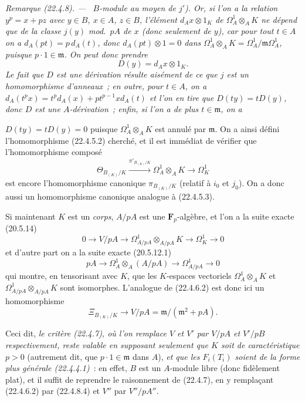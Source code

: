 \documentclass[10pt,oneside]{book}
\makeatletter
\newcommand{\setmanualcurrentlabel}[1]{\def\@currentlabel{#1}}
\newcommand{\oldpage}[2][]{%
  \setcounter{footnote}{0}%
  \marginpar{\scriptsize\textbf{#1}~|~#2}\ignorespaces}
\newenvironment{remark}[1][]{%
  \setmanualcurrentlabel{#1}\par\medskip\noindent\itshape Remarque (#1). ---\ }{\par}
\makeatother
\begin{document}
\begin{remark}[22.4.8]
$B$-module au moyen de $j'$). Or, si l'on a la relation $y^p=x+pz$ avec
$y\in B$, $x\in A$, $z\in B$, l'élément $d_Ax\otimes1_K$ de
$\Omega^1_A\otimes_AK$ ne dépend que de la classe $j(y)$ mod.~$pA$ de $x$
(donc seulement de $y$), car pour tout $t\in A$ on a
$d_A(pt)=p\,d_A(t)$, donc $d_A(pt)\otimes1=0$ dans
$\Omega^1_A\otimes_AK=\Omega^1_A/\mathfrak m\Omega^1_A$, puisque
$p\cdot1\in\mathfrak m$. On peut donc prendre
\[
  D(y)=d_Ax\otimes1_K.
\]
Le fait que $D$ est une dérivation résulte aisément de ce que $j$ est un
homomorphisme d'anneaux~; en outre, pour $t\in A$, on a
$d_A(t^px)=t^p d_A(x)+pt^{p-1}x d_A(t)$ et l'on en tire que
$D(ty)=tD(y)$, donc $D$ est une $A$-dérivation~; enfin, si l'on a de plus
$t\in\mathfrak m$, on a

\oldpage[0\textsubscript{IV-1}]{201}

$D(ty)=tD(y)=0$ puisque $\Omega^1_A\otimes_AK$ est annulé par $\mathfrak m$.
On a ainsi défini l'homomorphisme (22.4.5.2) cherché, et il est immédiat de
vérifier que l'homomorphisme composé
\[
  \Theta_{B_{(K)}/K}\xrightarrow{\pi'_{B_{(K)}/K}}
  \Omega^1_A\otimes_AK\longrightarrow\Omega^1_K
\]
est encore l'homomorphisme canonique $\pi_{B_{(K)}/K}$ (relatif à $i_0$ et
$j_0$). On a donc aussi un homomorphisme canonique analogue à (22.4.5.3).

Si maintenant $K$ est un \emph{corps}, $A/pA$ est une $\mathbf F_p$-algèbre,
et l'on a la suite exacte (20.5.14)
\[
  0\longrightarrow V/pA\longrightarrow
  \Omega^1_{A/pA}\otimes_{A/pA}K\longrightarrow\Omega^1_K\longrightarrow0
\]
et d'autre part on a la suite exacte (20.5.12.1)
\[
  pA\longrightarrow\Omega^1_A\otimes_A(A/pA)
  \longrightarrow\Omega^1_{A/pA}\longrightarrow0
\]
qui montre, en tensorisant avec $K$, que les $K$-espaces vectoriels
$\Omega^1_A\otimes_AK$ et
$\Omega^1_{A/pA}\otimes_{A/pA}K$ sont isomorphes. L'analogue de (22.4.6.2) est
donc ici un homomorphisme
\begin{equation}
\label{0.22.4.8.4-fr}
  \Xi_{B_{(K)}/K}\longrightarrow V/pA=\mathfrak m/(\mathfrak m^2+pA).
  \tag{22.4.8.4}
\end{equation}

Ceci dit, \emph{le critère (22.4.7), où l'on remplace $V$ et $V'$ par $V/pA$
et $V'/pB$ respectivement, reste valable en supposant seulement que $K$ soit
de caractéristique $p>0$} (autrement dit, que $p\cdot1\in\mathfrak m$ dans
$A$), \emph{et que les $F_i(T_i)$ soient de la forme plus générale
(22.4.4.1)}~: en effet, $B$ est un $A$-module libre (donc fidèlement plat), et
il suffit de reprendre le raisonnement de (22.4.7), en y remplaçant (22.4.6.2)
par (22.4.8.4) et $V''$ par $V''/pA''$.
\end{remark}
\end{document}
